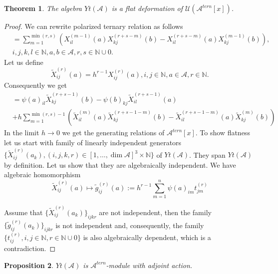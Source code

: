 \documentclass[10pt]{article}%
\numberwithin{equation}{section}
\newtheorem{thm}{Theorem}[section]
\newtheorem{prop}[thm]{Proposition}
\newcommand{\red}{\color{red}}
\def\dim{\operatorname{dim}}
\begin{document}
\begin{thm}\label{thm:deformation}
The algebra $Yt(\mathcal{A})$ is a flat deformation of $\mathcal{U}(\mathcal{A}^{tern}[x])$.
\end{thm}
\begin{proof}
We can rewrite polarized ternary relation as follows
\begin{eqnarray}
[X_{ij}^{(r)}(a),X_{kl}^{(s)}(b)]&=\sum\limits_{m=1}^{ \min(r,s)}(X_{il}^{(m-1)}(a)X_{kj}^{(r+s-m)}(b)-X_{il}^{(r+s-m)}(a)X_{kj}^{(m-1)}(b)),\label{eqn:PolarizedRTT_pt}\\
&i,j,k,l\in\mathbb{N},a,b\in\mathcal{A}, r,s\in\mathbb{N}\cup{0}.\nonumber
\end{eqnarray}
Let us define 
\[
\widetilde{X}_{ij}^{(r)}(a)= h^{r-1}X_{ij}^{(r)}(a),i,j\in\mathbb{N},a\in\mathcal{A}, r\in\mathbb{N}.
\]
Consequently we get
\begin{eqnarray}
[\widetilde{X}_{ij}^{(r)}(a),\widetilde{X}_{kl}^{(s)}(b)] &=
\psi(a)_{il}\widetilde{X}_{kj}^{(r+s-1)}(b)-\psi(b)_{kj}\widetilde{X}_{il}^{(r+s-1)}(a)\nonumber\\
&+h\sum\limits_{m=1}^{\min(r,s)-1}
(\widetilde{X}_{il}^{(m)}(a)\widetilde{X}_{kj}^{(r+s-1-m)}(b)-\widetilde{X}_{il}^{(r+s-1-m)}(a)\widetilde{X}_{kj}^{(m)}(b))\nonumber
\end{eqnarray}
In the limit $h\to 0$ we get the generating relations of $\mathcal{A}^{tern}[x]$. To show flatness let us start with family of linearly independent generators $\{\widetilde{X}_{ij}^{(r)}(a_k),(i,j,k,r)\in [1,\ldots,\dim \mathcal{A}]^3\times \mathbb{N}\}$ of $Yt(\mathcal{A})$. They span $Yt(\mathcal{A})$ by definition.
Let us show that they are algebraically independent. We have algebraic homomorphism
\[
\widetilde{X}_{ij}^{(r)}(a)\mapsto \widetilde{g}_{ij}^{(r)}(a):=h^{r-1}\sum\limits_{m=1}^n \psi(a)_{im} t^{(r)}_{jm}
\]


Assume that $\{\widetilde{X}_{ij}^{(r)}(a_k)\}_{ijkr}$ are not independent, then the family $\{\widetilde{g}_{ij}^{(r)}(a_k)\}_{ijkr}$ is not independent and, consequently, the family $\{t^{(r)}_{ij},i,j\in\mathbb{N},r\in\mathbb{N}\cup{0}\}$ is also algebraically dependent, which is a contradiction. 

\end{proof}
\begin{prop}
$Yt(\mathcal{A})$ is $\mathcal{A}^{tern}$-module with adjoint action.
\end{prop}
\end{document}
